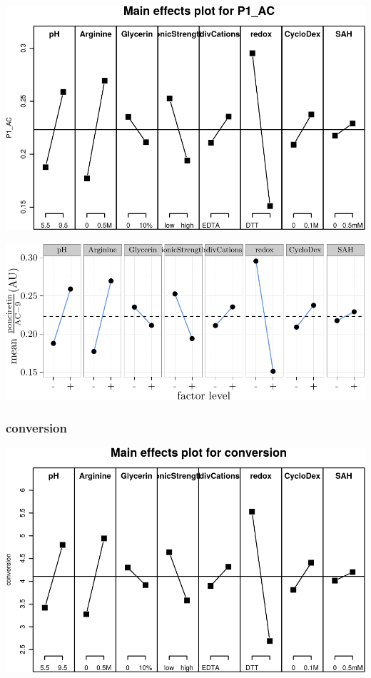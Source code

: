 \documentclass[]{article}
\begin{document}
\includegraphics{analysis_files/figure-latex/unnamed-chunk-9-1.pdf}

\includegraphics{analysis_files/figure-latex/unnamed-chunk-10-1.pdf}

\subsubsection{conversion}\label{conversion}

\includegraphics{analysis_files/figure-latex/unnamed-chunk-11-1.pdf}
\end{document}
